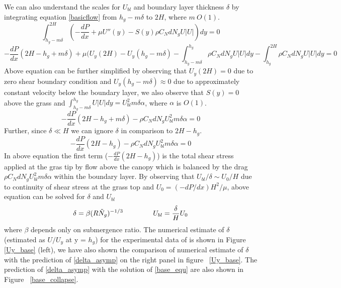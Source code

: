 \documentclass[12pt]{report}   %
\newcommand{\Ndg}{\tilde{N}_g}
\begin{document}
We can also understand the scales for $U_{bl}$ and boundary layer thickness $\delta$ by integrating equation \eqref{basicflow} from $h_g-m\delta$ to $2H$, where $m ~ O(1)$.
\begin{equation}
 \int_{h_g-m\delta}^{2H} \left( -\frac{dP}{dx}+\mu U''(y) -S(y) \rho C_N d N_gU |U|\right)dy = 0 
\end{equation}
\begin{equation*}
-\frac{dP}{dx}(2H-h_g+m\delta)+\mu (U_y(2H)-U_y(h_g-m\delta) -\int_{h_g-m\delta}^{h_g} \rho C_N d N_gU |U|dy -\int_{h_g}^{2H} \rho C_N d N_gU |U|dy =0
\end{equation*}
Above equation can be further simplified by observing that $U_y(2H)=0$ due to zero shear boundary condition and $U_y(h_g-m\delta) \approx 0$ due to approximately constant velocity below the boundary layer, we also observe that $S(y)=0$ above the grass and $\int_{h_g-m\delta}^{h_g} U |U| dy = U_{bl}^2 m\delta \alpha$, where $\alpha$ is $O(1)$.
\begin{equation*}
-\frac{dP}{dx}(2H-h_g+m\delta) - \rho C_N d N_g U_{bl}^2 m \delta \alpha  =0
\end{equation*}
Further, since $\delta \ll H$ we can ignore $\delta$ in comparison to $2H-h_g$.
\begin{equation}
-\frac{dP}{dx}(2H-h_g) - \rho C_N d N_g U_{bl}^2 m \delta \alpha  =0
\end{equation}
In above equation the first term ($ -\frac{dP}{dx}(2H-h_g)$) is the total shear stress applied at the gras tip by flow above the canopy which is balanced by the drag $\rho C_N d N_g U_{bl}^2 m \delta \alpha $ within the boundary layer. By observing that $ U_{bl}/\delta \sim U_0/H$ due to continuity of shear stress at the grass top and $U_0 = (-dP/dx) H^2/\mu$, above equation can be solved for $\delta$ and $U_{bl}$
\begin{equation}
 \delta = \beta (R\Ndg)^{-1/3} \hspace{1.5cm} U_{bl} = \frac{\delta}{H} U_0 
 \label{delta_asymp}
\end{equation}
where $\beta$ depends only on submergence ratio. The numerical estimate of $\delta$ (estimated as $U/U_y$ at y = $h_g$) for the experimental data of \cite{Nepf04} is shown in Figure \ref{Uy_base} (left), we have also shown the comparison of numerical estimate of $\delta$ with the prediction of \eqref{delta_asymp} on the right panel in figure ~\ref{Uy_base}.
The prediction of \eqref{delta_asymp} with the solution of \eqref{base_equ} are also shown in Figure ~\ref{base_collapse}. 
\end{document}
